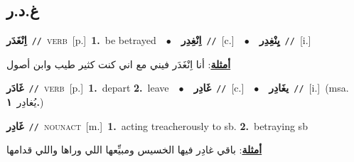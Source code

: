 \documentclass[10pt,a4paper,twoside]{article} %
\begin{document}
\begin{multicols}{2}
\vspace{-3mm}
\subsection*{\color{blue}\foreignlanguage{arabic}{غ.د.ر}\color{blue}{}} 

{\setlength\topsep{0pt}\textbf{\foreignlanguage{arabic}{اِنْغَدَر}}\ {\color{gray}\texttt{//}\color{black}}\ \textsc{verb}\ [p.]\ \textbf{1.}~be betrayed\ \ $\bullet$\ \ \setlength\topsep{0pt}\textbf{\foreignlanguage{arabic}{اِنْغِدِر}}\ {\color{gray}\texttt{//}\color{black}}\ [c.]\ \ $\bullet$\ \ \setlength\topsep{0pt}\textbf{\foreignlanguage{arabic}{يِنْغِدِر}}\ {\color{gray}\texttt{//}\color{black}}\ [i.]\  \begin{flushright}\color{gray}\foreignlanguage{arabic}{\textbf{\underline{\foreignlanguage{arabic}{أمثلة}}}: أنا اِنْغَدَر فيني مع اني كنت كثير طيب وابن أصول}\end{flushright}\color{black}} \vspace{2mm}

{\setlength\topsep{0pt}\textbf{\foreignlanguage{arabic}{غَادَر}}\ {\color{gray}\texttt{//}\color{black}}\ \textsc{verb}\ [p.]\ \textbf{1.}~depart  \textbf{2.}~leave\ \ $\bullet$\ \ \setlength\topsep{0pt}\textbf{\foreignlanguage{arabic}{غَادِر}}\ {\color{gray}\texttt{//}\color{black}}\ [c.]\ \ $\bullet$\ \ \setlength\topsep{0pt}\textbf{\foreignlanguage{arabic}{يغَادِر}}\ {\color{gray}\texttt{//}\color{black}}\ [i.]\ \color{gray}(msa. \foreignlanguage{arabic}{يُغادِر}~\foreignlanguage{arabic}{\textbf{١.}})\color{black}\ } \vspace{2mm}

{\setlength\topsep{0pt}\textbf{\foreignlanguage{arabic}{غَادِر}}\ {\color{gray}\texttt{//}\color{black}}\ \textsc{noun\textunderscore act}\ [m.]\ \textbf{1.}~acting treacherously to sb.  \textbf{2.}~betraying sb\  \begin{flushright}\color{gray}\foreignlanguage{arabic}{\textbf{\underline{\foreignlanguage{arabic}{أمثلة}}}: باقي غادِر فيها الخسيس ومبيِّعها اللي وراها واللي قدامها}\end{flushright}\color{black}} \vspace{2mm}


\end{multicols}
\end{document}
